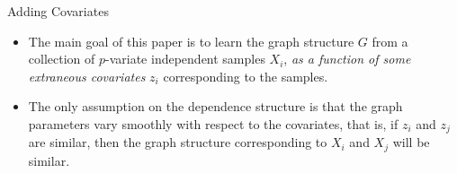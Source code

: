 \documentclass[
  ignorenonframetext,
]{beamer}
\providecommand{\tightlist}{%
  \setlength{\itemsep}{0pt}\setlength{\parskip}{0pt}}\usepackage{longtable,booktabs,array}
\begin{document}
\begin{frame}{Adding Covariates}
\protect\hypertarget{adding-covariates}{}

\begin{itemize}
\tightlist
\item
  The main goal of this paper is to learn the graph structure \(G\) from
  a collection of \(p\)-variate independent samples \(X_i\), \emph{as a
  function of some extraneous covariates} \(z_i\) corresponding to the
  samples.
\item
  The only assumption on the dependence structure is that the graph
  parameters vary smoothly with respect to the covariates, that is, if
  \(z_i\) and \(z_j\) are similar, then the graph structure
  corresponding to \(X_i\) and \(X_j\) will be similar.
\end{itemize}
\end{frame}
\end{document}
